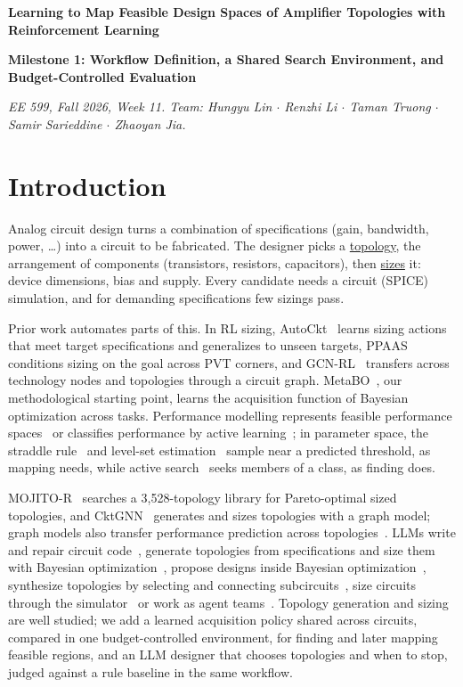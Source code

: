 \documentclass[10pt]{article}
\begin{document}
{\large\bfseries Learning to Map Feasible Design Spaces of Amplifier Topologies with Reinforcement Learning\par}
{\normalsize\bfseries Milestone 1: Workflow Definition, a Shared Search Environment, and Budget-Controlled Evaluation\par}
{\small\itshape EE 599, Fall 2026, Week 11. Team: Hungyu Lin $\cdot$ Renzhi Li $\cdot$ Taman Truong $\cdot$ Samir Sarieddine $\cdot$ Zhaoyan Jia.\par}

\section{Introduction}\label{sec:related}
Analog circuit design turns a combination of specifications (gain, bandwidth, power, \dots) into a
circuit to be fabricated. The designer picks a \uline{topology}, the arrangement of components (transistors, resistors,
capacitors), then \uline{sizes} it: device dimensions, bias and supply. Every candidate needs a circuit (SPICE)
simulation, and for demanding specifications few sizings pass.

Prior work automates parts of this. In RL sizing, AutoCkt~\cite{autockt} learns sizing actions that meet target
specifications and generalizes to unseen targets, PPAAS~\cite{ppaas} conditions sizing on the goal across PVT corners,
and GCN-RL~\cite{gcnrl} transfers across technology nodes and topologies through a circuit graph. MetaBO~\cite{metabo},
our methodological starting point, learns the acquisition function of Bayesian optimization across tasks.
Performance modelling represents feasible performance spaces~\cite{debernardinis} or classifies
performance by active learning~\cite{linli,zhang22}; in parameter space, the straddle rule~\cite{bryan} and level-set
estimation~\cite{gotovos} sample near a predicted threshold, as mapping needs, while active search~\cite{garnett} seeks members
of a class, as finding does.

MOJITO-R~\cite{mojitor} searches a
3,528-topology library for Pareto-optimal sized topologies, and CktGNN~\cite{cktgnn} generates
and sizes topologies with a graph model; graph models also transfer performance prediction across
topologies~\cite{wusavidis}. LLMs write and repair circuit code~\cite{analogcoder}, generate topologies from
specifications and size them with Bayesian optimization~\cite{analogcoderpro}, propose designs inside Bayesian
optimization~\cite{adollm}, synthesize topologies by selecting and connecting subcircuits~\cite{analogxpert}, size
circuits through the simulator~\cite{eesizer} or work as agent teams~\cite{analogsage}. Topology generation and sizing
are well studied; we add a learned acquisition policy shared across circuits, compared in one
budget-controlled environment, for finding and later mapping feasible regions,
and an LLM designer that chooses topologies and when to stop, judged against a rule baseline in the same workflow.
\end{document}
